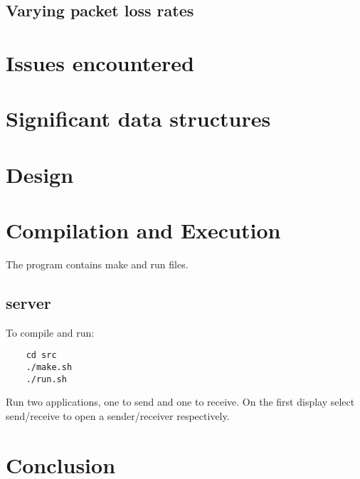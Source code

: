 \documentclass[a4paper,10pt]{article}
\begin{document}
\subsection{Varying packet loss rates}

\section{Issues encountered}

\section{Significant data structures}

\section{Design}

\section{Compilation and Execution}
The program contains make and run files.
\subsection{server}
To compile and run:
\begin{verbatim}
	cd src
	./make.sh
	./run.sh
\end{verbatim}
Run two applications, one to send and one to receive. On the first display
select send/receive to open a sender/receiver respectively.

\section{Conclusion}


\pagebreak


\end{document}
